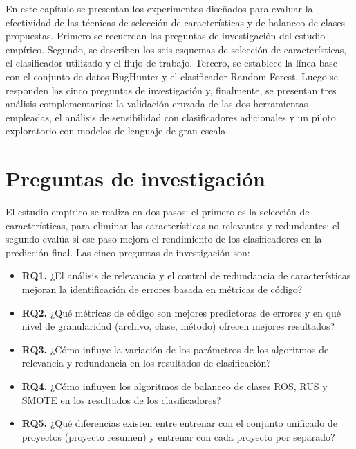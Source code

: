 En este capítulo se presentan los experimentos diseñados para evaluar la efectividad de las técnicas de selección de características y de balanceo de clases propuestas. Primero se recuerdan las preguntas de investigación del estudio empírico. Segundo, se describen los seis esquemas de selección de características, el clasificador utilizado y el flujo de trabajo. Tercero, se establece la línea base con el conjunto de datos BugHunter y el clasificador Random Forest. Luego se responden las cinco preguntas de investigación y, finalmente, se presentan tres análisis complementarios: la validación cruzada de las dos herramientas empleadas, el análisis de sensibilidad con clasificadores adicionales y un piloto exploratorio con modelos de lenguaje de gran escala.

\section{Preguntas de investigación}

El estudio empírico se realiza en dos pasos: el primero es la selección de características, para eliminar las características no relevantes y redundantes; el segundo evalúa si ese paso mejora el rendimiento de los clasificadores en la predicción final. Las cinco preguntas de investigación son:

\begin{itemize}
    \item \textbf{RQ1.} ¿El análisis de relevancia y el control de redundancia de características mejoran la identificación de errores basada en métricas de código?
    \item \textbf{RQ2.} ¿Qué métricas de código son mejores predictoras de errores y en qué nivel de granularidad (archivo, clase, método) ofrecen mejores resultados?
    \item \textbf{RQ3.} ¿Cómo influye la variación de los parámetros de los algoritmos de relevancia y redundancia en los resultados de clasificación?
    \item \textbf{RQ4.} ¿Cómo influyen los algoritmos de balanceo de clases ROS, RUS y SMOTE en los resultados de los clasificadores?
    \item \textbf{RQ5.} ¿Qué diferencias existen entre entrenar con el conjunto unificado de proyectos (proyecto resumen) y entrenar con cada proyecto por separado?
\end{itemize}



